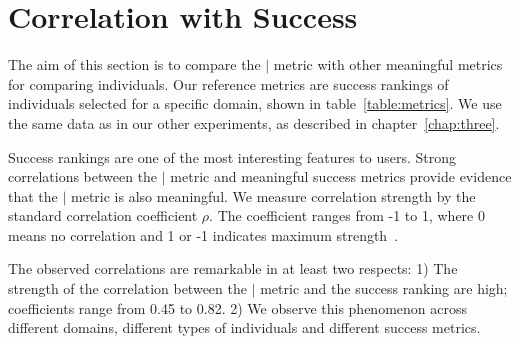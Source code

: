 %		
\section{Correlation with Success}
\label{sec:success}


The aim of this section is to compare the $\mid$ metric with other meaningful metrics for comparing individuals. Our reference metrics are success rankings of individuals selected for a specific domain, shown in table~\ref{table:metrics}. We use the same data as in our other experiments, as described in chapter~\ref{chap:three}. 

Success rankings are one of the most interesting features to users. Strong correlations between the $\mid$ metric and meaningful success metrics provide evidence that the $\mid$ metric is also meaningful. We measure correlation strength by the standard correlation coefficient $\rho$. The coefficient ranges from -1 to 1, where 0 means no correlation and 1 or -1 indicates maximum strength~\cite{Fisher1921}.

The observed correlations are remarkable in at least two respects: 1) The strength of the correlation between the $\mid$ metric and the success ranking are high; coefficients range from 0.45 to 0.82. 2) We observe this phenomenon across different domains, different types of individuals and different success metrics.


